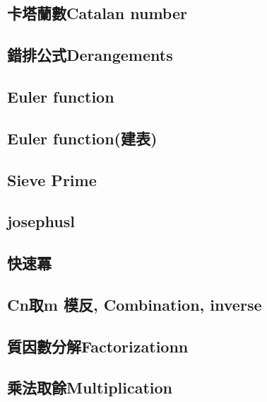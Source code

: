 \subsection{卡塔蘭數Catalan number}


\subsection{錯排公式Derangements}


\subsection{Euler function}


\subsection{Euler function(建表)}


\subsection{Sieve Prime}


\subsection{josephusl}


\subsection{快速冪}


\subsection{Cn取m 模反, Combination, inverse}


\subsection{質因數分解Factorizationn}


\subsection{乘法取餘Multiplication}


